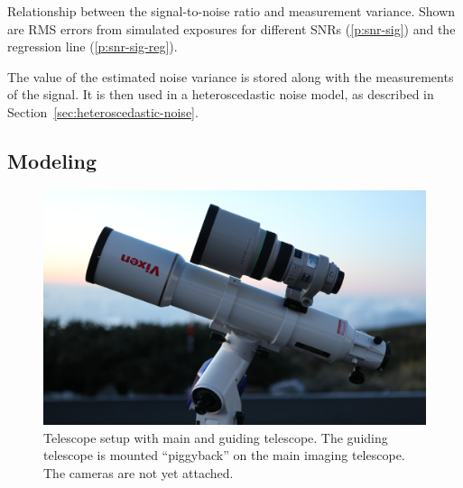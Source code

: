 \begin{marginfigure}
\footnotesize
\setlength{\figurewidth}{0.8\textwidth}%
\setlength{\figureheight}{0.6\textwidth}%
\caption[Relationship between the signal-to-noise ratio and measurement
variance.]{Relationship between the signal-to-noise ratio and measurement
variance. Shown are RMS errors from simulated exposures for different SNRs
(\ref*{p:snr-sig}) and the regression line (\ref*{p:snr-sig-reg}).}
\label{fig:snr-vs-sigma}
\end{marginfigure}

The value of the estimated noise variance is stored along with the measurements
of the signal. It is then used in a heteroscedastic noise model, as described in
Section~\ref{sec:heteroscedastic-noise}.

\subsection{Modeling}

\begin{figure}
\footnotesize
\includegraphics[width=\textwidth]{img/telescope_small.jpg}
\caption[Telescope setup with main and guiding telescope.]{Telescope setup with
main and guiding telescope. The guiding telescope is mounted ``piggyback'' on
the main imaging telescope. The cameras are not yet attached.}
\label{fig:typical-setup}
\end{figure}

